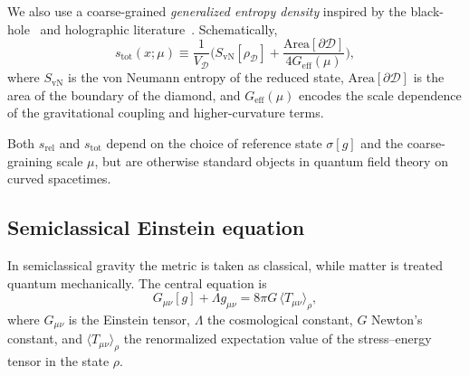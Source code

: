 \documentclass[aps,prd,twocolumn,superscriptaddress,nofootinbib,floatfix]{revtex4-2}
\newcommand{\Ddom}{\mathcal{D}}
\newcommand{\sg}{\sigma[g]}
\newcommand{\sr}{s_{\mathrm{rel}}}
\newcommand{\stot}{s_{\mathrm{tot}}}
\begin{document}
We also use a coarse-grained \emph{generalized entropy density} inspired by the black-hole~\cite{Bekenstein1973} and holographic literature~\cite{FaulknerLewkowyczMaldacena2013}.
Schematically,
\begin{equation}
    \stot(x;\mu)
    \equiv
    \frac{1}{V_{\Ddom}}
    \big(
        S_{\mathrm{vN}}[\rho_{\Ddom}]
        + \frac{\mathrm{Area}[\partial\Ddom]}{4 G_{\mathrm{eff}}(\mu)}
    \big),
    \label{eq:stot-def}
\end{equation}
where $S_{\mathrm{vN}}$ is the von Neumann entropy of the reduced state, $\mathrm{Area}[\partial\Ddom]$ is the area of the boundary of the diamond, and $G_{\mathrm{eff}}(\mu)$ encodes the scale dependence of the gravitational coupling and higher-curvature terms.

Both $\sr$ and $\stot$ depend on the choice of reference state $\sg$ and the coarse-graining scale $\mu$, but are otherwise standard objects in quantum field theory on curved spacetimes.

\subsection{Semiclassical Einstein equation}

In semiclassical gravity the metric is taken as classical, while matter is treated quantum mechanically.
The central equation is
\begin{equation}
    G_{\mu\nu}[g] + \Lambda g_{\mu\nu}
    =
    8\pi G\,\langle T_{\mu\nu} \rangle_\rho,
    \label{eq:semi-einstein}
\end{equation}
where $G_{\mu\nu}$ is the Einstein tensor, $\Lambda$ the cosmological constant, $G$ Newton's constant, and $\langle T_{\mu\nu}\rangle_\rho$ the renormalized expectation value of the stress--energy tensor in the state $\rho$.

\begin{center}
\end{center}
\end{document}
